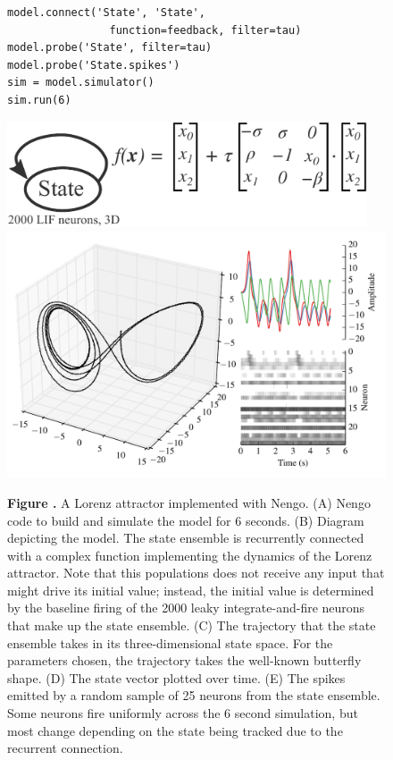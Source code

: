 \documentclass{frontiersSCNS}
\begin{document}
\begin{figure}
\begin{center}
\begin{minipage}{0.43\textwidth}
\begin{lstlisting}[basicstyle={\footnotesize\ttfamily}]
model.connect('State', 'State',
                function=feedback, filter=tau)
model.probe('State', filter=tau)
model.probe('State.spikes')
sim = model.simulator()
sim.run(6)
    \end{lstlisting}
  \end{minipage}
  \begin{minipage}{0.55\textwidth}
    \includegraphics[width=0.95\textwidth]{lorenz}
    \includegraphics[width=\textwidth]{lorenz_res}
  \end{minipage}
\end{center}
 \textbf{\label{fig:lorenz} Figure .}{
   A Lorenz attractor implemented with Nengo.
   (A) Nengo code to build and simulate the model
   for 6 seconds.
   (B) Diagram depicting the model. The state ensemble
   is recurrently connected with a complex function
   implementing the dynamics of the Lorenz attractor.
   Note that this populations does not receive
   any input that might drive its initial value;
   instead, the initial value is determined by
   the baseline firing of the 2000 leaky integrate-and-fire
   neurons that make up the state ensemble.
   (C) The trajectory that the state ensemble takes
   in its three-dimensional state space.
   For the parameters chosen, the trajectory takes
   the well-known butterfly shape.
   (D) The state vector plotted over time.
   (E) The spikes emitted by a random sample of 25
   neurons from the state ensemble.
   Some neurons fire uniformly across the 6 second simulation,
   but most change depending on the state being tracked
   due to the recurrent connection.}
\end{figure}
\end{document}
